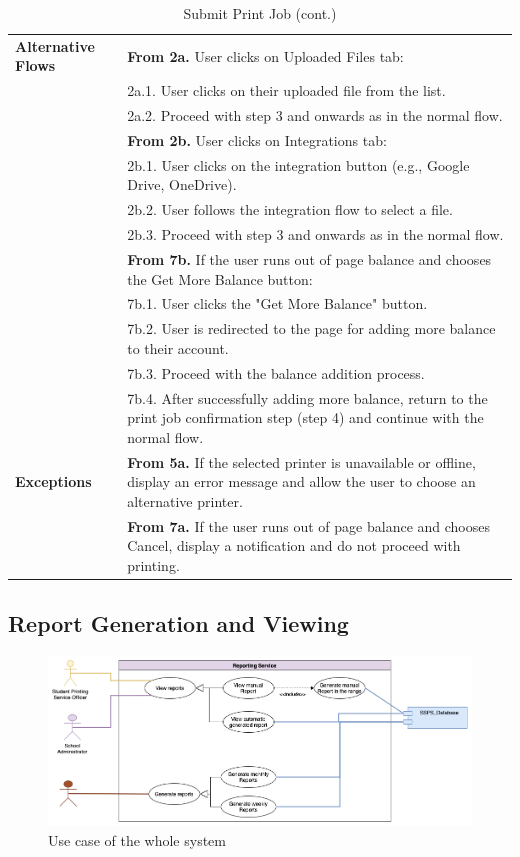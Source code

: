 \begin{table}[H]
\begin{tabular}{|p{5cm}|p{9cm}|}
\hline
\textbf{Alternative Flows} & 
\textbf{From 2a.} User clicks on Uploaded Files tab: \\
&2a.1. User clicks on their uploaded file from the list. \\
&2a.2. Proceed with step 3 and onwards as in the normal flow. \\
& \textbf{From 2b.} User clicks on Integrations tab: \\
&2b.1. User clicks on the integration button (e.g., Google Drive, OneDrive). \\
&2b.2. User follows the integration flow to select a file. \\
&2b.3. Proceed with step 3 and onwards as in the normal flow. \\
& \textbf{From 7b.} If the user runs out of page balance and chooses the Get More Balance button: \\
&7b.1. User clicks the "Get More Balance" button. \\
&7b.2. User is redirected to the page for adding more balance to their account. \\
&7b.3. Proceed with the balance addition process. \\
&7b.4. After successfully adding more balance, return to the print job confirmation step (step 4) and continue with the normal flow. \\
\hline
\textbf{Exceptions} & 
\textbf{From 5a.} If the selected printer is unavailable or offline, display an error message and allow the user to choose an alternative printer. \\
& \textbf{From 7a.} If the user runs out of page balance and chooses Cancel, display a notification and do not proceed with printing. \\
\hline
\end{tabular}
\caption{Submit Print Job (cont.)}
\end{table}

\subsection{Report Generation and Viewing}

\begin{figure}[H]
  \includegraphics[max width=0.9\linewidth]{chapters/3. use-case-diagram/reporting-service.png}
  \caption{Use case of the whole system}%
\end{figure}

